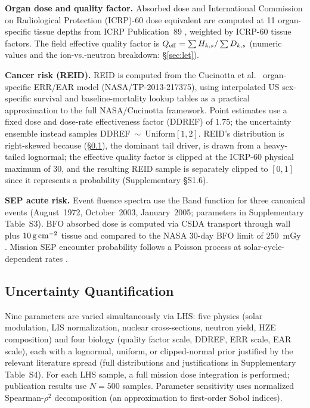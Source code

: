 \textbf{Organ dose and quality factor.} Absorbed dose and International
Commission on Radiological Protection (ICRP)-60 dose
equivalent \citep{icrp60} are computed at 11 organ-specific tissue depths
from ICRP Publication~89 \citep{icrp89}, weighted by ICRP-60 tissue factors.
The field effective quality factor is $Q_\mathrm{eff} = \sum H_{k,s}/\sum D_{k,s}$
(numeric values and the ion-vs.-neutron breakdown: \S\ref{sec:let}).

\textbf{Cancer risk (REID).} REID is computed from the Cucinotta et al.\
\cite{cucinotta2013} organ-specific ERR/EAR model (NASA/TP-2013-217375),
using interpolated US sex-specific survival and baseline-mortality lookup
tables as a practical approximation to the full NASA/Cucinotta framework.
Point estimates use a fixed dose and dose-rate effectiveness factor
(DDREF) of $1.75$; the uncertainty ensemble
instead samples DDREF~$\sim$~Uniform$[1,2]$. REID's distribution is
right-skewed because \code{Q\_factor} (\S\ref{sec:uq}), the dominant tail
driver, is drawn from a heavy-tailed lognormal; the effective quality
factor is clipped at the ICRP-60 physical maximum of $30$, and the
resulting REID sample is separately clipped to $[0,1]$ since it represents
a probability (Supplementary \S{}S1.6).

\textbf{SEP acute risk.} Event fluence spectra use the Band function
\citep{tylka2006} for three canonical events (August~1972, October~2003,
January~2005; parameters in Supplementary Table~S3). BFO absorbed dose is
computed via CSDA transport through wall plus $10\,\mathrm{g\,cm^{-2}}$ tissue and compared
to the NASA 30-day BFO limit of $250$~mGy \citep{cucinotta2010}. Mission SEP
encounter probability follows a Poisson process at solar-cycle-dependent
rates \citep{feynman1993}.

\subsection{Uncertainty Quantification}
\label{sec:uq}

Nine parameters are varied simultaneously via LHS: five physics
(solar modulation, LIS normalization, nuclear
cross-sections, neutron yield, HZE composition) and four biology (quality
factor scale, DDREF, ERR scale, EAR scale), each with a lognormal, uniform,
or clipped-normal prior justified by the relevant literature spread
(full distributions and justifications in Supplementary Table~S4). For each
LHS sample, a full mission dose integration is performed; publication
results use $N=500$ samples. Parameter sensitivity uses normalized
Spearman-$\rho^2$ decomposition (an approximation to first-order Sobol
indices).
\label{sec:sobol}

